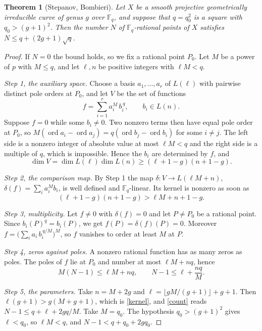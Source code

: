 \documentclass[11pt,letterpaper]{article}
\newtheorem{theorem}{Theorem}[section]
\numberwithin{equation}{section}
\begin{document}
\begin{theorem}[Stepanov, Bombieri]\label{stepanov}
Let $X$ be a smooth projective geometrically irreducible curve of genus $g$ over $\mathbb F_q$, and suppose that $q=q_0^2$ is a square with $q_0>(g+1)^2$. Then the number $N$ of $\mathbb F_q$-rational points of $X$ satisfies $N\le q+(2g+1)\sqrt q$.
\end{theorem}
\begin{proof}
If $N=0$ the bound holds, so we fix a rational point $P_0$. Let $M$ be a power of $p$ with $M\le q$, and let $\ell,n$ be positive integers with $\ell M<q$.

\emph{Step 1, the auxiliary space.} Choose a basis $a_1,\dots,a_r$ of $L(\ell)$ with pairwise distinct pole orders at $P_0$, and let $V$ be the set of functions
\[
f=\sum_{i=1}^ra_i^M\,b_i^{\,q},\qquad b_i\in L(n).
\]
Suppose $f=0$ while some $b_i\ne0$. Two nonzero terms then have equal pole order at $P_0$, so $M(\operatorname{ord}a_i-\operatorname{ord}a_j)=q(\operatorname{ord}b_j-\operatorname{ord}b_i)$ for some $i\ne j$. The left side is a nonzero integer of absolute value at most $\ell M<q$ and the right side is a multiple of $q$, which is impossible. Hence the $b_i$ are determined by $f$, and
\[
\dim V=\dim L(\ell)\dim L(n)\ge(\ell+1-g)(n+1-g).
\]

\emph{Step 2, the comparison map.} By Step 1 the map $\delta\colon V\to L(\ell M+n)$, $\delta(f)=\sum_ia_i^Mb_i$, is well defined and $\mathbb F_q$-linear. Its kernel is nonzero as soon as
\begin{equation}\label{kernel}
(\ell+1-g)(n+1-g)>\ell M+n+1-g .
\end{equation}

\emph{Step 3, multiplicity.} Let $f\ne0$ with $\delta(f)=0$ and let $P\ne P_0$ be a rational point. Since $b_i(P)^q=b_i(P)$, we get $f(P)=\delta(f)(P)=0$. Moreover $f=\big(\sum_ia_i\,b_i^{\,q/M}\big)^M$, so $f$ vanishes to order at least $M$ at $P$.

\emph{Step 4, zeros against poles.} A nonzero rational function has as many zeros as poles. The poles of $f$ lie at $P_0$ and number at most $\ell M+nq$, hence
\begin{equation}\label{count}
M(N-1)\le\ell M+nq,\qquad N-1\le\ell+\frac{nq}M .
\end{equation}

\emph{Step 5, the parameters.} Take $n=M+2g$ and $\ell=\lfloor gM/(g+1)\rfloor+g+1$. Then $\ell(g+1)>g(M+g+1)$, which is \eqref{kernel}, and \eqref{count} reads $N-1\le q+\ell+2gq/M$. Take $M=q_0$. The hypothesis $q_0>(g+1)^2$ gives $\ell<q_0$, so $\ell M<q$, and $N-1<q+q_0+2gq_0$.
\end{proof}
\end{document}
